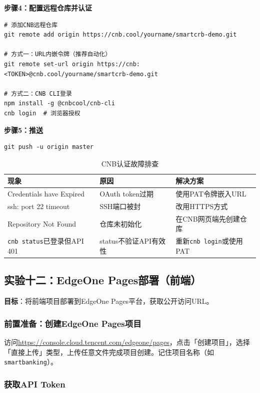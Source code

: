 \textbf{步骤4：配置远程仓库并认证}

\begin{lstlisting}[style=shell]
# 添加CNB远程仓库
git remote add origin https://cnb.cool/yourname/smartcrb-demo.git

# 方式一：URL内嵌令牌（推荐自动化）
git remote set-url origin https://cnb:<TOKEN>@cnb.cool/yourname/smartcrb-demo.git

# 方式二：CNB CLI登录
npm install -g @cnbcool/cnb-cli
cnb login  # 浏览器授权
\end{lstlisting}

\textbf{步骤5：推送}

\begin{lstlisting}[style=shell]
git push -u origin master
\end{lstlisting}

\begin{table}[H]
\centering
\begin{tabular}{lll}
\toprule
\textbf{现象} & \textbf{原因} & \textbf{解决方案} \\
\midrule
Credentials have Expired & OAuth token过期 & 使用PAT令牌嵌入URL \\
ssh: port 22 timeout & SSH端口被封 & 改用HTTPS方式 \\
Repository Not Found & 仓库未初始化 & 在CNB网页端先创建仓库 \\
\texttt{cnb status}已登录但API 401 & status不验证API有效性 & 重新\texttt{cnb login}或使用PAT \\
\bottomrule
\end{tabular}
\caption{CNB认证故障排查}
\end{table}

\subsection{实验十二：EdgeOne Pages部署（前端）}

\textbf{目标}：将前端项目部署到EdgeOne Pages平台，获取公开访问URL。

\subsubsection*{前置准备：创建EdgeOne Pages项目}

访问\url{https://console.cloud.tencent.com/edgeone/pages}，点击「创建项目」，选择「直接上传」类型，上传任意文件完成项目创建。记住项目名称（如\texttt{smartbanking}）。

\subsubsection*{获取API Token}

